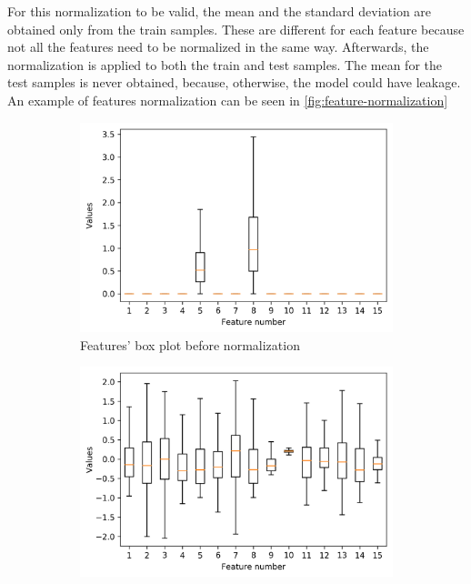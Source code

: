 For this normalization to be valid, the mean and the standard deviation are obtained only from 
the train samples. These are different for each feature because not all the features need to 
be normalized in the same way. Afterwards, the normalization is applied to both the train 
and test samples. The mean for the test samples is never obtained, because, otherwise, the
model could have \gls{leakage}. An example of features normalization can be seen in
\autoref{fig:feature-normalization}

\begin{figure}
  \centering

  \begin{subfigure}[t]{.49\textwidth}
    \includegraphics[width=\textwidth]{images/features_original}

    \caption{Features' box plot before normalization \label{fig:feature-normalization-before}}
  \end{subfigure}
  \hfill
  \begin{subfigure}[t]{.49\textwidth}
    \includegraphics[width=\textwidth]{images/features_normalized}


\end{subfigure}
\end{figure}

